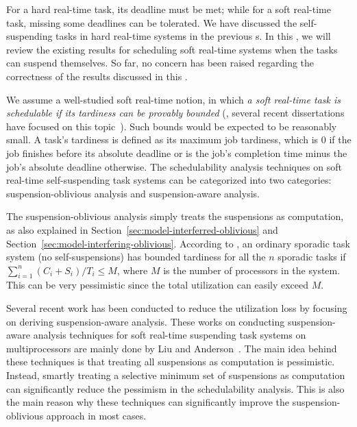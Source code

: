 \label{sec:soft-realtime}

For a hard real-time task, its deadline must be met; while for a soft real-time task, missing some deadlines can be tolerated. We have discussed the self-suspending tasks in hard real-time systems in the previous \mysectionrefnormal{}s. In this \mysectionrefnormal{}, we will review the existing results for scheduling soft real-time systems when the tasks can suspend themselves. So far, no concern has been raised regarding the correctness of the results discussed in this \mysectionrefnormal{}. 


 We assume a well-studied soft real-time notion, in which \emph{a soft real-time task is schedulable if its tardiness can be provably bounded} (\eg, several recent dissertations have focused on this topic~\cite{leontyev2010compositional, devi2006soft}). Such bounds would be expected to be reasonably small. A task's tardiness is defined as its maximum job tardiness, which is $0$ if the job finishes before its absolute deadline or is the job's completion time minus the job's absolute deadline otherwise. 
The schedulability analysis techniques on soft real-time self-suspending task systems can be categorized into two categories: suspension-oblivious analysis and suspension-aware analysis.

\label{sec:sus-oblivious-soft}

 The suspension-oblivious analysis simply treats the suspensions as computation, as also explained in Section~\ref{sec:model-interferred-oblivious} and Section~\ref{sec:model-interfering-oblivious}. According to \cite{Devi2005,Leontyev072},
an ordinary sporadic task system (\ie no self-suspensions) has bounded tardiness for all the $n$ sporadic tasks if $\sum_{i=1}^{n} (C_i+S_i)/T_i \leq M$, where $M$ is the number of processors in the system. This can be very pessimistic since the total utilization can easily exceed $M$.

\label{sec:sus-aware-soft}

Several recent work has been conducted to reduce the utilization loss by focusing on deriving suspension-aware analysis. 
These works on conducting suspension-aware analysis techniques for soft real-time suspending task systems on multiprocessors are mainly done by Liu and Anderson~\cite{Liu3,Liu4,Liu5,Liu9,Liu11}. The main idea behind these techniques is that treating all suspensions as computation is pessimistic. Instead, smartly treating a selective minimum set of suspensions as computation can significantly reduce the pessimism in the schedulability analysis. This is also the main reason why these techniques can significantly improve the suspension-oblivious approach in most cases.

